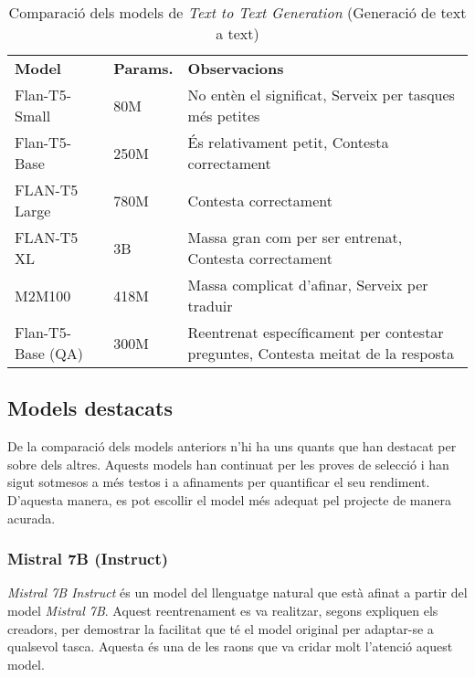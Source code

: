 \begin{table}[H]
    \centering
    \begin{tabular}{|>{\centering}m{2.3cm}|m{1.6cm}|m{10.7cm}|}
        \hline
        \multicolumn{3}{|c|}{\textbf{Models de \textit{Text to Text Generation}}} \\
        \hline
        \textbf{Model} & \textbf{Params.} & \textbf{Observacions} \\
        \hline
        Flan-T5-Small & 80M & No entèn el significat, Serveix per tasques més petites \\
        Flan-T5-Base & 250M & És relativament petit, Contesta correctament \\
        FLAN-T5 Large & 780M & Contesta correctament \\
        FLAN-T5 XL & 3B & Massa gran com per ser entrenat, Contesta correctament \\
        M2M100 & 418M & Massa complicat d'afinar, Serveix per traduir \\
        Flan-T5-Base (QA) & 300M & Reentrenat específicament per contestar preguntes, Contesta meitat de la resposta  \\
        \hline
    \end{tabular}
    \caption{Comparació dels models de \textit{Text to Text Generation} (Generació de text a text)}
    \label{tab:t2t-comparison}
\end{table}

\subsection{Models destacats}
De la comparació dels models anteriors n'hi ha uns quants que han destacat per sobre dels altres. Aquests models han continuat per les proves de selecció i han sigut sotmesos a més testos i a afinaments per quantificar el seu rendiment. D'aquesta manera, es pot escollir el model més adequat pel projecte de manera acurada.

\subsubsection{Mistral 7B (Instruct)}
\textit{Mistral 7B Instruct} \cite{mistral} és un model del llenguatge natural que està afinat a partir del model \textit{Mistral 7B}. Aquest reentrenament es va realitzar, segons expliquen els creadors, per demostrar la facilitat que té el model original per adaptar-se a qualsevol tasca. Aquesta és una de les raons que va cridar molt l'atenció aquest model.

